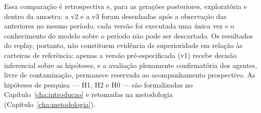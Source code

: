 Essa comparação é retrospectiva e, para as gerações posteriores, exploratória e dentro da amostra: a v2 e a v3 foram desenhadas após a observação das anteriores no mesmo período, cada versão foi executada uma única vez e o conhecimento do modelo sobre o período não pode ser descartado. Os resultados do replay, portanto, não constituem evidência de superioridade em relação às carteiras de referência: apenas a versão pré-especificada (v1) recebe decisão inferencial sobre as hipóteses, e a avaliação plenamente confirmatória dos agentes, livre de contaminação, permanece reservada ao acompanhamento prospectivo. As hipóteses de pesquisa --- H1, H2 e H0 --- são formalizadas no Capítulo~\ref{cha:introducao} e retomadas na metodologia (Capítulo~\ref{cha:metodologia}).
